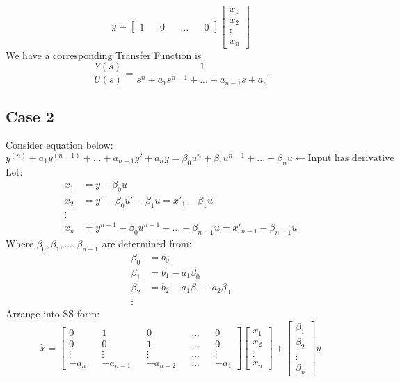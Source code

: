 \[
y =
\begin{bmatrix}
	1 &   & 0 &   & ... &   & 0 
\end{bmatrix}
\begin{bmatrix}
	x_1    \\
	x_2    \\
	\vdots \\
	x_n    
\end{bmatrix}
\]
We have a corresponding Transfer Function is 
\[\frac{Y(s)}{U(s)} = \frac{1}{s^n+a_1s^{n-1}+...+a_{n-1}s+a_n}\]

\subsection{Case 2}
Consider equation below:
\[
y^{(n)} + a_1y^{(n-1)} + ... + a_{n-1}y' + a_n y = \beta_0u^n + \beta_1u^{n-1}+ ... +\beta_nu  \leftarrow \text{Input has derivative}
\]
Let:
\[
\begin{split}
	x_1 &= y - \beta_0 u \\
	x_2 &= y' - \beta_0 u' - \beta_1 u = x'_1-\beta_1u \\
	\vdots \\
	x_n &= y^{n-1} - \beta_0 u^{n-1} - ... - \beta_{n-1} u = x'_{n-1}-\beta_{n-1}u
\end{split}
\]
Where \(\beta_0 , \beta_1 , ... , \beta_{n-1}\) are determined from:
\[
\begin{split}
	\beta_0 &= b_0 \\
	\beta_1 &= b_1 - a_1\beta_0 \\
	\beta_2 &= b_2 - a_1\beta_1 - a_2\beta_0 \\
	\vdots
\end{split}
\]
Arrange into SS form:
\[
\dot{x} = 
\begin{bmatrix}
	0      &   & 1        &   & 0        &   & ... &   & 0      \\
	0      &   & 0        &   & 1        &   & ... &   & 0      \\
	\vdots &   & \vdots   &   & \vdots   &   & ... &   & \vdots \\
	-a_n   &   & -a_{n-1} &   & -a_{n-2} &   & ... &   & -a_1   
\end{bmatrix}
\begin{bmatrix}
	x_1    \\
	x_2    \\
	\vdots \\
	x_n    
\end{bmatrix} +
\begin{bmatrix}
	\beta_1 \\
	\beta_2 \\
	\vdots  \\
	\beta_n 
\end{bmatrix} u
\]
